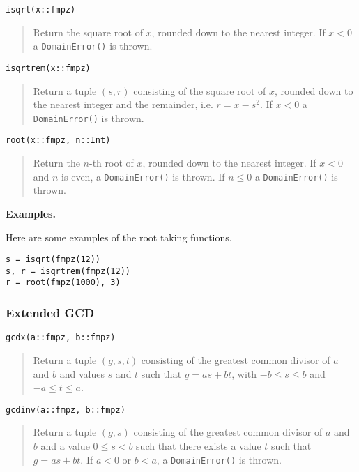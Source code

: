 \documentclass[a4paper,10pt]{article}
\newcommand{\code}{\lstinline}
\newcommand{\desc}[1]{\vspace{-3mm}\begin{quote}#1\end{quote}}
\begin{document}
{{\begin{lstlisting}
isqrt(x::fmpz)
\end{lstlisting}

\desc{Return the square root of $x$, rounded down to the nearest integer. If $x < 0$
a \code{DomainError()} is thrown.}

\begin{lstlisting}
isqrtrem(x::fmpz)
\end{lstlisting}

\desc{Return a tuple $(s, r)$ consisting of the square root of $x$, rounded down to the 
nearest integer and the remainder, i.e. $r = x - s^2$. If $x < 0$ a \code{DomainError()}
is thrown.}

\begin{lstlisting}
root(x::fmpz, n::Int)
\end{lstlisting}

\desc{Return the $n$-th root of $x$, rounded down to the nearest integer. If $x < 0$ and
$n$ is even, a \code{DomainError()} is thrown. If $n \leq 0$ a \code{DomainError()} is
thrown.}

\textbf{Examples.}

Here are some examples of the root taking functions.

\begin{lstlisting}
s = isqrt(fmpz(12))
s, r = isqrtrem(fmpz(12))
r = root(fmpz(1000), 3)
\end{lstlisting}

\subsubsection{Extended GCD}

\begin{lstlisting}
gcdx(a::fmpz, b::fmpz)
\end{lstlisting}

\desc{Return a tuple $(g, s, t)$ consisting of the greatest common divisor of $a$ and $b$
and values $s$ and $t$ such that $g = as + bt$, with $-b \leq s \leq b$ and 
$-a \leq t \leq a$.}

\begin{lstlisting}
gcdinv(a::fmpz, b::fmpz)
\end{lstlisting}

\desc{Return a tuple $(g, s)$ consisting of the greatest common divisor of $a$ and $b$
and a value $0 \leq s < b$ such that there exists a value $t$ such that 
$g = as + bt$. If $a < 0$ or $b < a$, a \code{DomainError()} is thrown.}

}}
\end{document}
